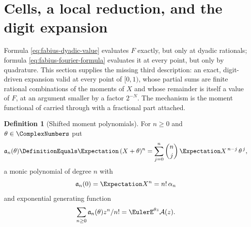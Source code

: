 \documentclass[11pt,a4paper,oneside,openany]{book}
\theoremstyle{definition}
\newtheorem{definition}[definition]{Definition}
\theoremstyle{remark}
\begin{document}

\section{Cells, a local reduction, and the digit expansion}

Formula \eqref{eq:fabius-dyadic-value} evaluates $F$ exactly, but only at dyadic
rationals; formula \eqref{eq:fabius-fourier-formula} evaluates it at every point, but
only by quadrature.  This section supplies the missing third description: an exact,
digit-driven expansion valid at every point of $[0,1)$, whose partial sums are finite
rational combinations of the moments of $X$ and whose remainder is itself a value of
$F$, at an argument smaller by a factor $2^{-N}$.  The mechanism is the moment
functional of  carried through with a fractional part
attached.

\begin{definition}[Shifted moment polynomials]\label{def:fabius-shift-polynomial}
For $n\ge0$ and $\theta\in\ComplexNumbers$ put
\begin{equation}\label{eq:fabius-shift-polynomial}
 \mathfrak a_n(\theta)\DefinitionEquals\Expectation\,(X+\theta)^n
 =\sum_{j=0}^{n}\binom nj\,\Expectation X^{\,n-j}\,\theta^{\,j},
\end{equation}
a monic polynomial of degree $n$ with
\[
 \mathfrak a_n(0)=\Expectation X^n=n!\,\alpha_n
\]
and exponential generating function
\[
 \sum_{n\ge0}\mathfrak a_n(\theta)z^n/n!
 =\EulerE^{\theta z}\mathcal A(z).
\]
\end{definition}
\end{document}
